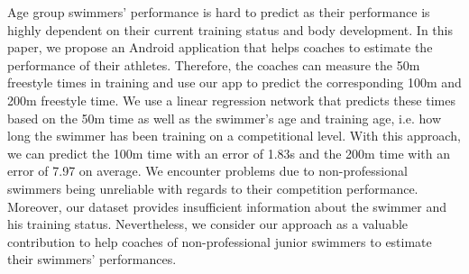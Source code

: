 Age group swimmers' performance is hard to predict as their performance is highly dependent on their current training status and body development. In this paper, we propose an Android application that helps coaches to estimate the performance of their athletes. Therefore, the coaches can measure the 50m freestyle times in training and use our app to predict the corresponding 100m and 200m freestyle time. We use a linear regression network that predicts these times based on the 50m time as well as the swimmer's age and training age, i.e. how long the swimmer has been training on a competitional level. With this approach, we can predict the 100m time with an error of 1.83s and the 200m time with an error of 7.97 on average. We encounter problems due to non-professional swimmers being unreliable with regards to their competition performance. Moreover, our dataset provides insufficient information about the swimmer and his training status. Nevertheless, we consider our approach as a valuable contribution to help coaches of non-professional junior swimmers to estimate their swimmers' performances.